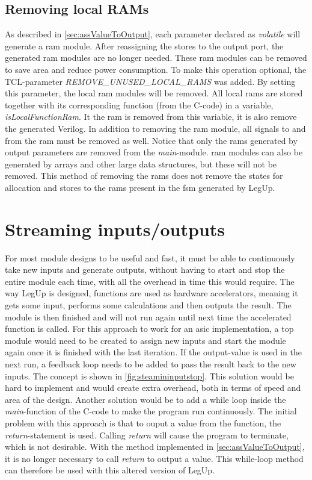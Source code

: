 \subsection{\label{subsec:removerams}Removing local RAMs}
As described in \cref{sec:assValueToOutput}, each parameter declared as \textit{volatile} will generate a \gls{ram} module. After reassigning the stores to the output port, the generated \gls{ram} modules are no longer needed. These \gls{ram} modules can be removed to save area and reduce power consumption. To make this operation optional, the TCL-parameter \textit{REMOVE\_UNUSED\_LOCAL\_RAMS} was added. By setting this parameter, the local \gls{ram} modules will be removed. All local \gls{ram}s are stored together with its corresponding function (from the C-code) in a variable, \textit{isLocalFunctionRam}. It the \gls{ram} is removed from this variable, it is also remove the generated Verilog. In addition to removing the \gls{ram} module, all signals to and from the \gls{ram} must be removed as well. Notice that only the \gls{ram}s generated by output parameters are removed from the \textit{main}-module. \gls{ram} modules can also be generated by arrays and other large data structures, but these will not be removed. This method of removing the \gls{ram}s does not remove the states for allocation and stores to the \gls{ram}s present in the \gls{fsm} generated by LegUp. 

\section{\label{sec:streamingio}Streaming inputs/outputs}
For most module designs to be useful and fast, it must be able to continuously take new inputs and generate outputs, without having to start and stop the entire module each time, with all the overhead in time this would require. The way LegUp is designed, functions are used as hardware accelerators, meaning it gets some input, performs some calculations and then outputs the result. The module is then finished and will not run again until next time the accelerated function is called. For this approach to work for an \gls{asic} implementation, a top module would need to be created to assign new inputs and start the module again once it is finished with the last iteration. If the output-value is used in the next run, a feedback loop needs to be added to pass the result back to the new inputs. The concept is shown in \cref{fig:steamininputstop}. This solution would be hard to implement and would create extra overhead, both in terms of speed and area of the design. Another solution would be to add a while loop inside the \textit{main}-function of the C-code to make the program run continuously. The initial problem with this approach is that to ouput a value from the function, the \textit{return}-statement is used. Calling \textit{return} will cause the program to terminate, which is not desirable. With the method implemented in \cref{sec:assValueToOutput}, it is no longer necessary to call \textit{return} to output a value. This while-loop method can therefore be used with this altered version of LegUp.

